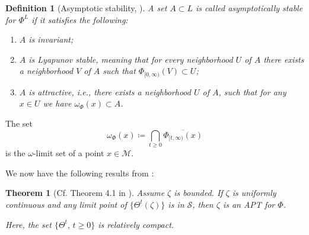 \documentclass{article}
\newtheorem{definition}{Definition}
\newtheorem{theorem}{Theorem}
\newcommand{\CM}{\mathcal{M}}
\begin{document}
\begin{definition}[Asymptotic stability, \cite{benaim2005stochastic}]
    A set $A\subset L$ is called \emph{asymptotically stable} for $\Phi^L$ if it satisfies the following:
    \begin{enumerate}
        \item $A$ is invariant;
        \item $A$ is Lyapunov stable, meaning that for every neighborhood $U$ of $A$ there exists a neighborhood $V$ of $A$ such that $\Phi_{[0,\infty)}(V)\subset U$;
        \item $A$ is attractive, i.e., there exists a neighborhood $U$ of $A$, such that for any $x\in U$ we have $\omega_\Phi(x)\subset A$. 
    \end{enumerate}
\end{definition}


The set
\begin{equation}
    \omega_\Phi(x)\coloneqq \bigcap_{t\geq 0}\overline{\Phi_{[t,\infty)}(x)}
\end{equation}
is the $\omega$-limit set of a point $x\in\CM$.  

We now have the following results from \cite{benaim2005stochastic}:
    \begin{theorem}[Cf. Theorem 4.1 in \cite{benaim2005stochastic}]\label{th:APT}
    Assume $\zeta$ is bounded. If $\zeta$ is uniformly continuous and any limit point of $\{\Theta^t(\zeta)\}$ is in $\mathcal{S}$, then $\zeta$ is an APT for $\Phi$. 

    Here, the set $\{\Theta^t,\,t\geq 0\}$ is relatively compact. 
\end{theorem}
\end{document}
